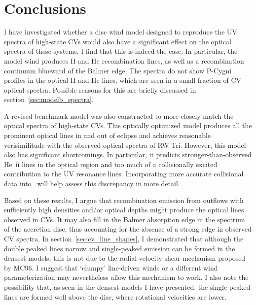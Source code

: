 %
%


\section{Conclusions}
\label{sec:cv_conclusions}

I have investigated whether a disc wind model designed to reproduce
the UV spectra of high-state CVs would also have a significant effect
on the optical spectra of these systems. I find that this is indeed
the case. In particular, the model wind produces H and He
recombination lines, as well as a recombination continuum blueward of
the Balmer edge. The spectra do not show P-Cygni profiles
in the optical H and He lines, which are seen in a small fraction of CV 
optical spectra. Possible reasons for this are briefly discussed in 
section~\ref{sec:modelb_spectra}.

A revised benchmark model was also constructed
to more closely match the optical spectra of high-state CVs. This
optically optimized model produces all the prominent optical lines in
and out of eclipse and achieves reasonable verisimilitude with the
observed optical spectra of RW Tri. However, this model also has
significant shortcomings. In particular, it predicts
stronger-than-observed He~{\sc ii} lines in the optical region and too
much of a collisionally excited contribution to the UV resonance lines. 
Incorporating more accurate collisional data into \py\ will help
assess this discrepancy in more detail.

Based on these results, I argue that recombination emission 
from outflows with sufficiently high densities and/or optical depths 
might produce the optical lines observed in CVs. It may also 
fill in the Balmer absorption edge in the spectrum of the accretion disc, 
thus accounting for the absence of a strong edge in observed CV spectra.
In section~\ref{sec:cv_line_shapes}, I demonstrated that
although the double peaked lines narrow and 
single-peaked emission can be formed in the densest models, 
this is not due to the radial velocity shear mechanism proposed by MC96.
I suggest that `clumpy' line-driven winds or a different
wind parameterization may nevertheless allow this mechanism to work.
I also note the possibility that, as seen in the densest models I have presented, 
the single-peaked lines are formed well above the disc, where 
rotational velocities are lower.

